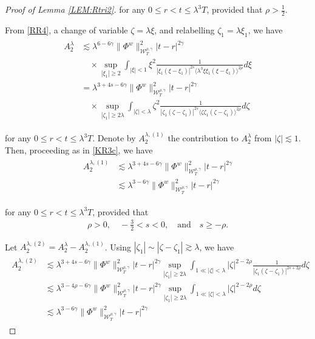 \documentclass[letterpaper, 11pt,  reqno]{amsart}
\DeclareMathOperator*{\intt}{\int}
\newcommand{\1}{\hspace{0.5mm}\text{I}\hspace{0.5mm}}
\newcommand{\noi}{\noindent}
\newcommand{\g}{\gamma}
\newcommand{\ld}{\lambda}
\newcommand{\les}{\lesssim}
\newcommand{\ges}{\gtrsim}
\newcommand{\jb}[1]
{\langle #1 \rangle}
\newcommand{\W}{\mathcal{W}}
\newcommand{\z}{\zeta}
\numberwithin{equation}{section}
\numberwithin{theorem}{section}
\begin{document}
\begin{proof}[Proof of Lemma \ref{LEM:Rtri2}]
\noi
for any $0 \le r < t \le \ld^3T$, 
provided that  $\rho > \frac 12$.



From  \eqref{RR4}, 
 a change of variable $\z = \ld \xi$, 
and relabelling $\z_1 = \ld \xi_1$, 
 we have 
\begin{align}
\begin{split}
A^\ld_2 
& \les 
 \ld^{6 -6\g} 
 \|\Phi^{w}  \|_{\W_{T}^{\rho, \g}}^2
 |t-r|^{2\g} \\
 & 
 \quad 
 \times 
\sup_{|\xi_1|\ge 2}
\intt_{|\xi|< 1}
\xi^2
\frac{1}
{|\xi_1(\xi - \xi_1)|^{2s}\jb{\ld^3 \xi \xi_1 (\xi-\xi_1)}^{2\rho}} d\xi\\
& = 
 \ld^{3+4s -6\g} 
 \|\Phi^{w}  \|_{\W_{T}^{\rho, \g}}^2
 |t-r|^{2\g} \\
  & 
 \quad 
 \times 
\sup_{|\z_1|\ge 2\ld}
\intt_{|\z|< \ld}
\z^2
\frac1 
{|\z_1(\z - \z_1)|^{2s}\jb{\z\z_1(\z-\z_1)}^{2\rho}} d\z
\end{split}
\label{RR7}
\end{align}

\noi
for any $0 \le r < t \le \ld^3T$.
Denote by $A_2^{\ld, (1)}$
the contribution to $A^\ld_2$ from $|\z|\les 1$.
Then, 
proceeding as in \eqref{KR3c}, 
we have
\begin{align}
\begin{split}
A^{\ld, (1)}_2 
& \les  \ld^{3 + 4s -6\g} 
 \|\Phi^{w}  \|_{\W_{T}^{\rho, \g}}^2
 |t-r|^{2\g}\\
& \les  \ld^{3  -6\g} 
 \|\Phi^{w}  \|_{\W_{T}^{\rho, \g}}^2
 |t-r|^{2\g}
 \end{split}
\label{RR8}
\end{align}


\noi
for any $0 \le r < t \le \ld^3T$, 
provided that 
\begin{align*}
\rho > 0, \quad   -\frac 32 < s < 0, 
\quad \text{and} \quad  
s\ge -\rho.
\end{align*}

\noi
Let $A_2^{\ld, (2)} = A_2^{\ld}- A_2^{\ld, (1)}$.
Using $|\z_1| \sim |\z - \z_1|\ges \ld$, we have 
\begin{align}
\begin{split}
A^{\ld, (2)}_2 
& \les 
 \ld^{3 + 4s -6\g} 
 \|\Phi^{w}  \|_{\W_{T}^{\rho, \g}}^2
 |t-r|^{2\g} 
\sup_{|\z_1|\ge 2\ld}
\intt_{1\ll |\z|< \ld}
|\z|^{2- 2\rho}
\frac1 
{|\z_1(\z - \z_1)|^{2s+ 2\rho}} d\z\\
& \les 
 \ld^{3 -4\rho  -6\g} 
 \|\Phi^{w}  \|_{\W_{T}^{\rho, \g}}^2
 |t-r|^{2\g} 
\sup_{|\z_1|\ge 2\ld}
\intt_{1\ll |\z|< \ld}
|\z|^{2- 2\rho}
d\z\\
& \les  \ld^{3  -6\g} 
 \|\Phi^{w}  \|_{\W_{T}^{\rho, \g}}^2
 |t-r|^{2\g}
\end{split}
\label{RR10}
\end{align}



\end{proof}
\end{document}
